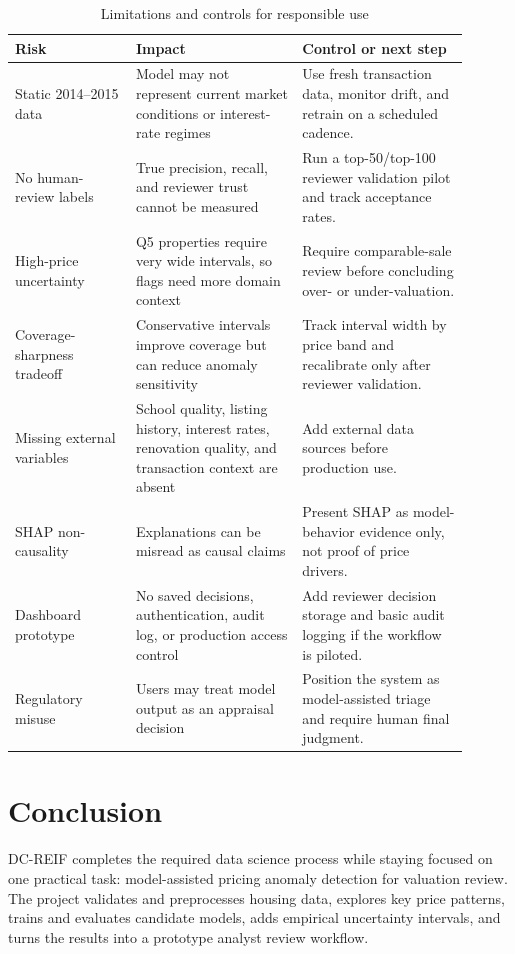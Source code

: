 \documentclass[12pt,a4paper]{article}
\begin{document}
\begin{table}[H]
\centering
\caption{Limitations and controls for responsible use}
\label{tab:risk_controls}
\begin{tabular}{p{0.24\linewidth}p{0.33\linewidth}p{0.33\linewidth}}
\toprule
\textbf{Risk} & \textbf{Impact} & \textbf{Control or next step}\\
\midrule
Static 2014--2015 data & Model may not represent current market conditions or interest-rate regimes & Use fresh transaction data, monitor drift, and retrain on a scheduled cadence.\\
No human-review labels & True precision, recall, and reviewer trust cannot be measured & Run a top-50/top-100 reviewer validation pilot and track acceptance rates.\\
High-price uncertainty & Q5 properties require very wide intervals, so flags need more domain context & Require comparable-sale review before concluding over- or under-valuation.\\
Coverage-sharpness tradeoff & Conservative intervals improve coverage but can reduce anomaly sensitivity & Track interval width by price band and recalibrate only after reviewer validation.\\
Missing external variables & School quality, listing history, interest rates, renovation quality, and transaction context are absent & Add external data sources before production use.\\
SHAP non-causality & Explanations can be misread as causal claims & Present SHAP as model-behavior evidence only, not proof of price drivers.\\
Dashboard prototype & No saved decisions, authentication, audit log, or production access control & Add reviewer decision storage and basic audit logging if the workflow is piloted.\\
Regulatory misuse & Users may treat model output as an appraisal decision & Position the system as model-assisted triage and require human final judgment.\\
\bottomrule
\end{tabular}
\end{table}

\section{Conclusion}
DC-REIF completes the required data science process while staying focused on one practical task: model-assisted pricing anomaly detection for valuation review. The project validates and preprocesses housing data, explores key price patterns, trains and evaluates candidate models, adds empirical uncertainty intervals, and turns the results into a prototype analyst review workflow.
\end{document}
